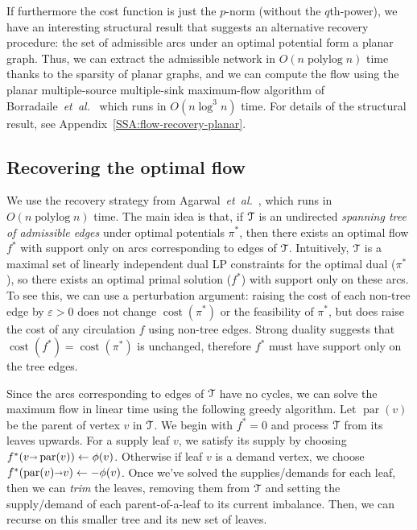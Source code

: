 \documentclass[a4paper,UKenglish]{socg-lipics-v2018}
\def\etal{\emph{et~al.}}
\def\etal{\textit{et~al.}}
\def\polylog{\mathop{\mathrm{polylog}}}
\def\eps{\varepsilon}
\def\fsupply{\phi}
\def\arcto{\mathord\shortrightarrow}
\def\arc#1#2{#1\arcto#2}
\def\cost{\operatorname{cost}}
\def\parent{\operatorname{par}}
\theoremstyle{plain}
\numberwithin{figure}{section}
\def\EMPH#1{\textcolor{BrickRed}{{\emph{#1}}}}
\begin{document}
If furthermore the cost function is just the $p$-norm (without the $q$th-power),
we have an interesting structural result that suggests an alternative recovery procedure:
the set of admissible arcs under an optimal potential form a planar graph.
Thus, we can extract the admissible network in $O(n\polylog n)$ time thanks
to the sparsity of planar graphs, and we can compute the flow using the planar
multiple-source multiple-sink maximum-flow algorithm of
Borradaile~\etal~\cite{BKMNW17} which runs in $O(n\log^3 n)$ time.
For details of the structural result, see Appendix~\ref{SSA:flow-recovery-planar}.

\begin{toappendix}

\subsection{Recovering the optimal flow}
\label{SSA:flow-recovery}

We use the recovery strategy from Agarwal~\etal~\cite{AFPVX17}, which runs in
$O(n\polylog n)$ time.
The main idea is that, if $\EuScript{T}$ is an undirected \emph{spanning tree of admissible edges}
under optimal potentials $\pi^*$, then there exists an optimal flow $f^*$ with
support only on arcs corresponding to edges of $\EuScript{T}$.
Intuitively, $\EuScript{T}$ is a maximal set of linearly independent dual LP
constraints for the optimal dual ($\pi^*$), so there exists an optimal primal
solution ($f^*$) with support only on these arcs.
To see this, we can use a perturbation argument: raising the cost of each
non-tree edge by $\eps > 0$ does not change $\cost(\pi^*)$ or the feasibility
of $\pi^*$, but does raise the cost of any circulation $f$ using non-tree edges.
Strong duality suggests that $\cost(f^*) = \cost(\pi^*)$ is unchanged,
therefore $f^*$ must have support only on the tree edges.

Since the arcs corresponding to edges of $\EuScript{T}$ have no cycles, we can
solve the maximum flow in linear time using the following greedy algorithm.
Let $\parent(v)$ be the parent of vertex $v$ in $\EuScript{T}$.
We begin with $f^* = 0$ and process $\EuScript{T}$ from its leaves upwards.
For a supply leaf $v$, we satisfy its supply by choosing
$f^*(\arc{v}{\parent(v)}) \gets \fsupply(v)$.
Otherwise if leaf $v$ is a demand vertex, we choose
$f^*(\arc{\parent(v)}{v}) \gets -\fsupply(v)$.
Once we've solved the supplies/demands for each leaf, then we can \EMPH{trim}
the leaves, removing them from $\EuScript{T}$ and setting the supply/demand
of each parent-of-a-leaf to its current imbalance.
Then, we can recurse on this smaller tree and its new set of leaves.


\end{toappendix}
\end{document}
